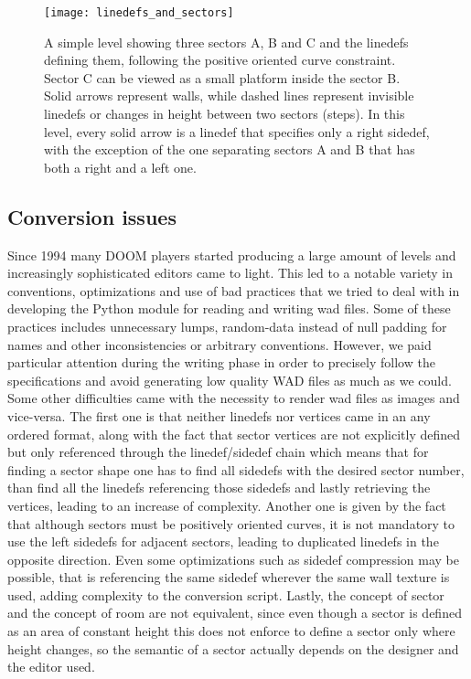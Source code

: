 \begin{figure}
	\begin{center}
		\texttt{[image: linedefs\_and\_sectors]}
	\end{center}
	
	\captionsetup{width=0.8\linewidth}
	\caption[A simple level showing sectors and linedefs]{A simple level showing three sectors A, B and C and the linedefs defining them, following the positive oriented curve constraint. Sector C can be viewed as a small platform inside the sector B. Solid arrows represent walls, while dashed lines represent invisible linedefs or changes in height between two sectors (steps). In this level, every solid arrow is a linedef that specifies only a right sidedef, with the exception of the one separating sectors A and B that has both a right and a left one.}
	\label{fig:sectors}
	\medskip
	
\end{figure}


\subsection{Conversion issues} 
Since 1994 many DOOM players started producing a large amount of levels and increasingly sophisticated editors came to light. This led to a notable variety in conventions, optimizations and use of bad practices that we tried to deal with in developing the Python module for reading and writing wad files. Some of these practices includes unnecessary lumps, random-data instead of null padding for names and other inconsistencies or arbitrary conventions. 
However, we paid particular attention during the writing phase in order to precisely follow the specifications and avoid generating low quality WAD files as much as we could.
Some other difficulties came with the necessity to render wad files as images and vice-versa. The first one is that neither \glspl{linedef} nor vertices came in an any ordered format, along with the fact that sector vertices are not explicitly defined but only referenced through the linedef/sidedef chain which means that for finding a sector shape one has to find all sidedefs with the desired sector number, than find all the linedefs referencing those sidedefs and lastly retrieving the vertices, leading to an increase of complexity. Another one is given by the fact that although sectors must be positively oriented curves, it is not mandatory to use the left sidedefs for adjacent sectors, leading to duplicated linedefs in the opposite direction. Even some optimizations such as sidedef compression may be possible, that is referencing the same sidedef wherever the same wall texture is used, adding complexity to the conversion script. Lastly, the concept of sector and the concept of room are not equivalent, since even though a sector is defined as an area of constant height this does not enforce to define a sector only where height changes, so the semantic of a sector actually depends on the designer and the editor used. 


